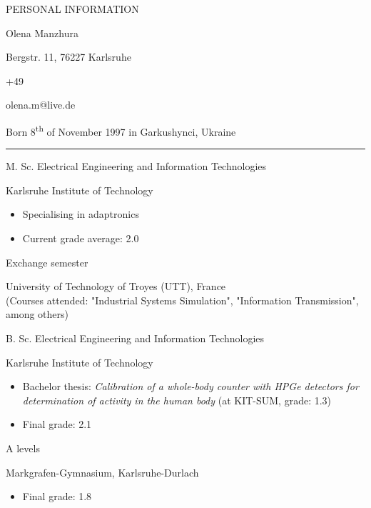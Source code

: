 \documentclass[a4paper,10pt]{article}
\newlength{\cvcolumngapwidth}
\newlength{\cvleftcolumnwidth}
\newlength{\cvrightcolumnwidth}
\newcommand{\cvnamestyle}[1]{{\Large\textcolor{cvnamecolor}{#1}}}
\newcommand{\cvsectionstyle}[1]{{\normalsize\textcolor{cvsectioncolor}{#1}}}
\newcommand{\cvtitlestyle}[1]{{\large\textcolor{cvtitlecolor}{#1}}}
\newcommand{\cvdurationstyle}[1]{{\small\textcolor{cvdurationcolor}{#1}}}
\newlength{\cvafteritemskipamount}
\newlength{\cvaftersectionskipamount}
\newlength{\cvafternameskipamount}
\newlength{\cvafterpersonalinfolineskipamount}
\newlength{\cvaftertitleskipamount}
\newlength{\cvparskip}
\newcommand{\cvpersonalinfo}[2]{
    \begin{minipage}[t]{\cvleftcolumnwidth}
        \vspace{0mm} %
        \raggedleft #1
    \end{minipage}%
    \hspace{\cvcolumngapwidth}%
    \begin{minipage}[t]{\cvrightcolumnwidth}
        \vspace{0mm} %
        #2
    \end{minipage}

    \vspace{\cvafteritemskipamount}
}
\newcommand{\cvname}[1]{
    \cvnamestyle{#1}

    \vspace{\cvafternameskipamount}
}
\newcommand{\cvpersonalinfolinewithicon}[3]{
    \raisebox{.5\fontcharht\font`E-.5\height}{\texttt{[image: \#2]}}
    #3

    \vspace{\cvafterpersonalinfolineskipamount}
}
\newcommand{\cvsection}[1]{
    \begin{minipage}[t][][b]{\cvleftcolumnwidth}
        \raggedleft\cvsectionstyle{#1}
    \end{minipage}%
    \hspace{\cvcolumngapwidth}%
    \begin{minipage}[t]{\cvrightcolumnwidth}
        \textcolor{cvrulecolor}{\rule{\cvrightcolumnwidth}{0.3mm}}
    \end{minipage}

    \vspace{\cvaftersectionskipamount}
}
\newcommand{\cvitem}[2]{
    \begin{minipage}[t]{\cvleftcolumnwidth}
    \strut\vspace*{-\baselineskip}\newline %
    \raggedleft #1
    \end{minipage}%
    \hspace{\cvcolumngapwidth}%
    \begin{minipage}[t]{\cvrightcolumnwidth}
        \setlength{\parskip}{\cvparskip}
        \strut\vspace*{-\baselineskip}\newline #2 %
    \end{minipage}

    \vspace{\cvafteritemskipamount}
}
\newcommand{\cvtitle}[1]{
    \cvtitlestyle{#1}

    \vspace{\cvaftertitleskipamount}
    \vspace{-\cvparskip}
}
\begin{document}
\cvpersonalinfo{
    \cvsectionstyle{PERSONAL INFORMATION}
}{
    \cvname{Olena Manzhura}

    \cvpersonalinfolinewithicon{height=4mm}{resources/europasscv-icons/address_europass_icon.pdf}{
        Bergstr. 11, 76227 Karlsruhe
    }

    \cvpersonalinfolinewithicon{height=4mm}{resources/europasscv-icons/mobile_europass_icon.pdf}{
        +49\;176\;232\;041\;82
    }

    \cvpersonalinfolinewithicon{height=4mm}{resources/europasscv-icons/mail_europass_icon.pdf}{
        olena.m@live.de
    }


    Born 8\textsuperscript{th} of November 1997 in Garkushynci, Ukraine
}

\cvsection{EDUCATION}
\cvitem{\cvdurationstyle{2018 -- now}}{\cvtitle{M. Sc. Electrical Engineering and Information Technologies}
    Karlsruhe Institute of Technology
    \begin{itemize}[leftmargin=*]
        \item Specialising in adaptronics
        \item Current grade average: 2.0
    \end{itemize}
}

\cvitem{\cvdurationstyle{January 2020 -- June 2020}}{\cvtitle{Exchange semester}
	University of Technology of Troyes (UTT), France \\
	(Courses attended: "Industrial Systems Simulation", "Information Transmission", among others)
}

\cvitem{\cvdurationstyle{2015 -- 2018}}{\cvtitle{B. Sc. Electrical Engineering and Information Technologies}
	Karlsruhe Institute of Technology
	\begin{itemize}[leftmargin=*]
		\item Bachelor thesis: \textit{Calibration of a whole-body counter with HPGe detectors for determination of activity
in the human body} (at KIT-SUM, grade: 1.3)
		\item Final grade: 2.1
	\end{itemize}
}

\cvitem{\cvdurationstyle{2007 -- 2015}}{\cvtitle{A levels}
    Markgrafen-Gymnasium, Karlsruhe-Durlach
    \begin{itemize}[leftmargin=*]
        \item Final grade: 1.8
    \end{itemize}
}
\end{document}
